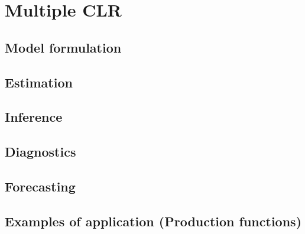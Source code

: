 \documentclass[
]{book}
\begin{document}
\hypertarget{multiple-clr}{%
\section{Multiple CLR}\label{multiple-clr}}

\hypertarget{model-formulation-1}{%
\subsection{Model formulation}\label{model-formulation-1}}

\hypertarget{estimation-1}{%
\subsection{Estimation}\label{estimation-1}}

\hypertarget{inference-1}{%
\subsection{Inference}\label{inference-1}}

\hypertarget{diagnostics}{%
\subsection{Diagnostics}\label{diagnostics}}

\hypertarget{forecasting-1}{%
\subsection{Forecasting}\label{forecasting-1}}

\hypertarget{examples-of-application-production-functions}{%
\subsection{Examples of application (Production functions)}\label{examples-of-application-production-functions}}

  
\end{document}
